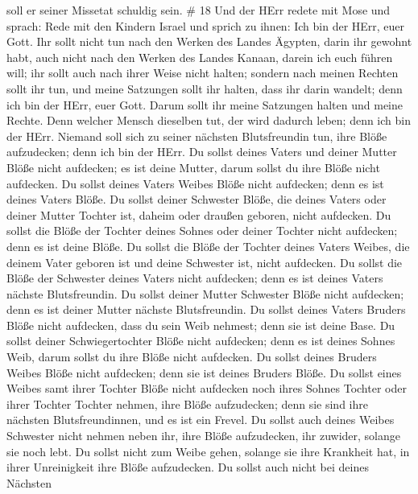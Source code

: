 soll er seiner Missetat schuldig sein. \# 18  Und der HErr
redete mit Mose und sprach:  Rede mit den Kindern Israel und
sprich zu ihnen: Ich bin der HErr, euer Gott.  Ihr sollt
nicht tun nach den Werken des Landes Ägypten, darin ihr gewohnt habt,
auch nicht nach den Werken des Landes Kanaan, darein ich euch führen
will; ihr sollt auch nach ihrer Weise nicht halten;  sondern
nach meinen Rechten sollt ihr tun, und meine Satzungen sollt ihr halten,
dass ihr darin wandelt; denn ich bin der HErr, euer Gott. 
Darum sollt ihr meine Satzungen halten und meine Rechte. Denn welcher
Mensch dieselben tut, der wird dadurch leben; denn ich bin der HErr.
 Niemand soll sich zu seiner nächsten Blutsfreundin tun,
ihre Blöße aufzudecken; denn ich bin der HErr.  Du sollst
deines Vaters und deiner Mutter Blöße nicht aufdecken; es ist deine
Mutter, darum sollst du ihre Blöße nicht aufdecken.  Du
sollst deines Vaters Weibes Blöße nicht aufdecken; denn es ist deines
Vaters Blöße.  Du sollst deiner Schwester Blöße, die deines
Vaters oder deiner Mutter Tochter ist, daheim oder draußen geboren,
nicht aufdecken.  Du sollst die Blöße der Tochter deines
Sohnes oder deiner Tochter nicht aufdecken; denn es ist deine Blöße.
 Du sollst die Blöße der Tochter deines Vaters Weibes, die
deinem Vater geboren ist und deine Schwester ist, nicht aufdecken.
 Du sollst die Blöße der Schwester deines Vaters nicht
aufdecken; denn es ist deines Vaters nächste Blutsfreundin.
 Du sollst deiner Mutter Schwester Blöße nicht aufdecken;
denn es ist deiner Mutter nächste Blutsfreundin.  Du sollst
deines Vaters Bruders Blöße nicht aufdecken, dass du sein Weib nehmest;
denn sie ist deine Base.  Du sollst deiner Schwiegertochter
Blöße nicht aufdecken; denn es ist deines Sohnes Weib, darum sollst du
ihre Blöße nicht aufdecken.  Du sollst deines Bruders
Weibes Blöße nicht aufdecken; denn sie ist deines Bruders Blöße.
 Du sollst eines Weibes samt ihrer Tochter Blöße nicht
aufdecken noch ihres Sohnes Tochter oder ihrer Tochter Tochter nehmen,
ihre Blöße aufzudecken; denn sie sind ihre nächsten Blutsfreundinnen,
und es ist ein Frevel.  Du sollst auch deines Weibes
Schwester nicht nehmen neben ihr, ihre Blöße aufzudecken, ihr zuwider,
solange sie noch lebt.  Du sollst nicht zum Weibe gehen,
solange sie ihre Krankheit hat, in ihrer Unreinigkeit ihre Blöße
aufzudecken.  Du sollst auch nicht bei deines Nächsten
